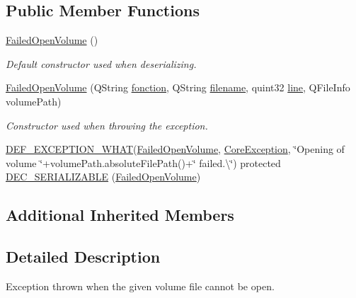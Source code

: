 \subsection*{Public Member Functions}
\begin{DoxyCompactItemize}
\item 
\hyperlink{class_gost_crypt_1_1_core_1_1_failed_open_volume_a517aeef18aafc11baae5dbcf7cac6a7d}{Failed\+Open\+Volume} ()
\begin{DoxyCompactList}\small\item\em Default constructor used when deserializing. \end{DoxyCompactList}\item 
\hyperlink{class_gost_crypt_1_1_core_1_1_failed_open_volume_adec57a060b296d0b529076debd733ee7}{Failed\+Open\+Volume} (Q\+String \hyperlink{class_gost_crypt_1_1_gost_crypt_exception_a29b8c93d5efbb1ff369107385725a939}{fonction}, Q\+String \hyperlink{class_gost_crypt_1_1_gost_crypt_exception_a749a12375f4ba9d502623b99d8252f38}{filename}, quint32 \hyperlink{class_gost_crypt_1_1_gost_crypt_exception_abf506d911f12a4e969eea500f90bd32c}{line}, Q\+File\+Info volume\+Path)
\begin{DoxyCompactList}\small\item\em Constructor used when throwing the exception. \end{DoxyCompactList}\item 
\hyperlink{_gost_crypt_exception_8h_a5bc1e1c6c9d6f46c84eeba49e33355f9}{D\+E\+F\+\_\+\+E\+X\+C\+E\+P\+T\+I\+O\+N\+\_\+\+W\+H\+AT}(\hyperlink{class_gost_crypt_1_1_core_1_1_failed_open_volume}{Failed\+Open\+Volume}, \hyperlink{class_gost_crypt_1_1_core_1_1_core_exception}{Core\+Exception}, \char`\"{}Opening of volume \char`\"{}+volume\+Path.\+absolute\+File\+Path()+\char`\"{} failed.\textbackslash{}\char`\"{}) protected \hyperlink{class_gost_crypt_1_1_core_1_1_failed_open_volume_a478ec8ec3b9ee41f6b7da77b24ca858d}{D\+E\+C\+\_\+\+S\+E\+R\+I\+A\+L\+I\+Z\+A\+B\+LE} (\hyperlink{class_gost_crypt_1_1_core_1_1_failed_open_volume}{Failed\+Open\+Volume})
\end{DoxyCompactItemize}
\subsection*{Additional Inherited Members}


\subsection{Detailed Description}
Exception thrown when the given volume file cannot be open. 

